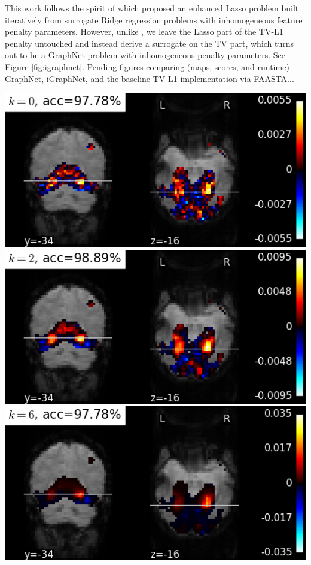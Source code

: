 This work follows the spirit of \citep{candes2007enhancing} which proposed an enhanced Lasso problem built iteratively from surrogate Ridge regression problems with inhomogeneous feature penalty parameters. However, unlike \citep{candes2007enhancing}, we leave the Lasso part of the TV-L1 penalty untouched and instead derive a surrogate on the TV part, which turns out to be a GraphNet problem with inhomogeneous penalty parameters.
See Figure \ref{fig:igraphnet}. Pending figures comparing (maps, scores, and
runtime) GraphNet, iGraphNet, and the baseline TV-L1 implementation via FAASTA...
\begin{marginfigure}
\includegraphics[width=1\linewidth]{figures/haxby_igraphnet_w_0_yz.png}
\includegraphics[width=1\linewidth]{figures/haxby_igraphnet_w_2_yz.png}
\includegraphics[width=1\linewidth]{figures/haxby_igraphnet_w_6_yz.png}

\end{marginfigure}
